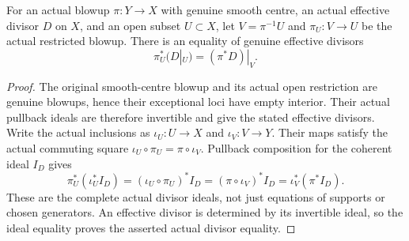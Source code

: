 \begin{theorem}
\label{hir:nc-actual-divisor-blowup-open-square}
\leanok
For an actual blowup $\pi:Y\to X$ with genuine smooth centre, an
actual effective divisor $D$ on $X$, and an open subset $U\subset X$,
let $V=\pi^{-1}U$ and $\pi_U:V\to U$ be the actual restricted blowup.
There is an equality of genuine effective divisors
\[
 \pi_U^*(D|_U)=(\pi^*D)|_V.
\]
\end{theorem}
\begin{proof}
The original smooth-centre blowup and its actual open restriction are
genuine blowups, hence their exceptional loci have empty interior.
Their actual pullback ideals are therefore invertible and give the
stated effective divisors.  Write the actual inclusions as
$\iota_U:U\to X$ and $\iota_V:V\to Y$.  Their maps satisfy the actual
commuting square
$\iota_U\circ\pi_U=\pi\circ\iota_V$.
Pullback composition for the coherent ideal $I_D$ gives
\[
 \pi_U^*(\iota_U^*I_D)
  =(\iota_U\circ\pi_U)^*I_D
  =(\pi\circ\iota_V)^*I_D
  =\iota_V^*(\pi^*I_D).
\]
These are the complete actual divisor ideals, not just equations of
supports or chosen generators.  An effective divisor is determined
by its invertible ideal, so the ideal equality proves the asserted
actual divisor equality.
\end{proof}

